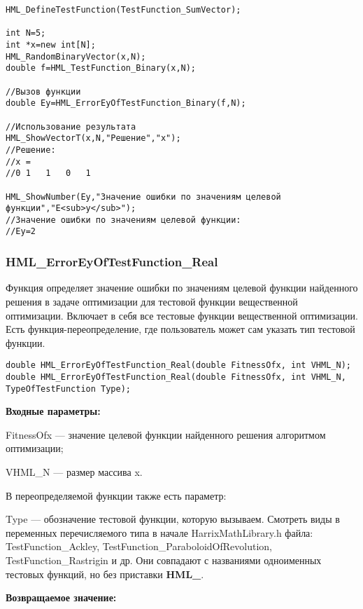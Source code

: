 \documentclass[a4paper,12pt]{article}
\begin{document}
\begin{lstlisting}[label=code_use_HML_ErrorEyOfTestFunction_Binary,caption=Пример использования]
HML_DefineTestFunction(TestFunction_SumVector);

int N=5;
int *x=new int[N];
HML_RandomBinaryVector(x,N);
double f=HML_TestFunction_Binary(x,N);

//Вызов функции
double Ey=HML_ErrorEyOfTestFunction_Binary(f,N);

//Использование результата
HML_ShowVectorT(x,N,"Решение","x");
//Решение:
//x =	
//0	1	1	0	1

HML_ShowNumber(Ey,"Значение ошибки по значениям целевой функции","E<sub>y</sub>");
//Значение ошибки по значениям целевой функции:
//Ey=2
\end{lstlisting}

\subsubsection{HML\_ErrorEyOfTestFunction\_Real}\label{HML_ErrorEyOfTestFunction_Real}

Функция определяет значение ошибки по значениям целевой функции найденного решения в задаче оптимизации для тестовой функции вещественной оптимизации. Включает в себя все тестовые функции вещественной оптимизации. Есть функция-переопределение, где пользователь может сам указать тип тестовой функции.


\begin{lstlisting}[label=code_syntax_HML_ErrorEyOfTestFunction_Real,caption=Синтаксис]
double HML_ErrorEyOfTestFunction_Real(double FitnessOfx, int VHML_N);
double HML_ErrorEyOfTestFunction_Real(double FitnessOfx, int VHML_N, TypeOfTestFunction Type);
\end{lstlisting}

\textbf{Входные параметры:}

FitnessOfx --- значение целевой функции найденного решения алгоритмом оптимизации;

VHML\_N --- размер массива x.

В переопределяемой функции также есть параметр:
  
Type --- обозначение тестовой функции, которую вызываем.
Смотреть виды в переменных перечисляемого типа в начале HarrixMathLibrary.h файла: TestFunction\_Ackley, TestFunction\_ParaboloidOfRevolution, TestFunction\_Rastrigin и др. Они совпадают с названиями одноименных тестовых функций, но без приставки \textbf{HML\_}.

\textbf{Возвращаемое значение:}
 
\end{document}
